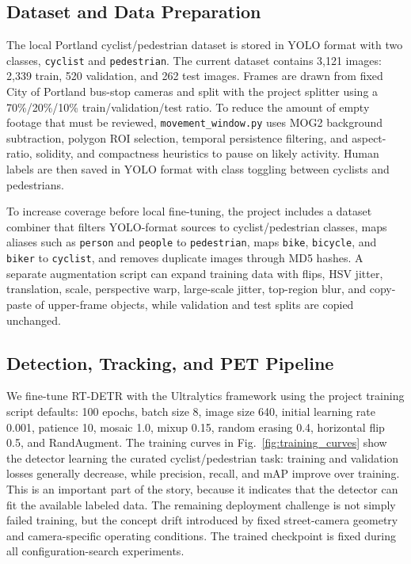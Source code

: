 \documentclass[conference]{IEEEtran}
\begin{document}
\subsection{Dataset and Data Preparation}
\label{sec:dataset}

The local Portland cyclist/pedestrian dataset is stored in YOLO format with two classes, \texttt{cyclist} and \texttt{pedestrian}. The current dataset contains 3,121 images: 2,339 train, 520 validation, and 262 test images. Frames are drawn from fixed City of Portland bus-stop cameras and split with the project splitter using a 70\%/20\%/10\% train/validation/test ratio. To reduce the amount of empty footage that must be reviewed, \texttt{movement\_window.py} uses MOG2 background subtraction, polygon ROI selection, temporal persistence filtering, and aspect-ratio, solidity, and compactness heuristics to pause on likely activity. Human labels are then saved in YOLO format with class toggling between cyclists and pedestrians.

To increase coverage before local fine-tuning, the project includes a dataset combiner that filters YOLO-format sources to cyclist/pedestrian classes, maps aliases such as \texttt{person} and \texttt{people} to \texttt{pedestrian}, maps \texttt{bike}, \texttt{bicycle}, and \texttt{biker} to \texttt{cyclist}, and removes duplicate images through MD5 hashes. A separate augmentation script can expand training data with flips, HSV jitter, translation, scale, perspective warp, large-scale jitter, top-region blur, and copy-paste of upper-frame objects, while validation and test splits are copied unchanged.

\subsection{Detection, Tracking, and PET Pipeline}

We fine-tune RT-DETR with the Ultralytics framework using the project training script defaults: 100 epochs, batch size 8, image size 640, initial learning rate 0.001, patience 10, mosaic 1.0, mixup 0.15, random erasing 0.4, horizontal flip 0.5, and RandAugment. The training curves in Fig.~\ref{fig:training_curves} show the detector learning the curated cyclist/pedestrian task: training and validation losses generally decrease, while precision, recall, and mAP improve over training. This is an important part of the story, because it indicates that the detector can fit the available labeled data. The remaining deployment challenge is not simply failed training, but the concept drift introduced by fixed street-camera geometry and camera-specific operating conditions. The trained checkpoint is fixed during all configuration-search experiments.
\end{document}
